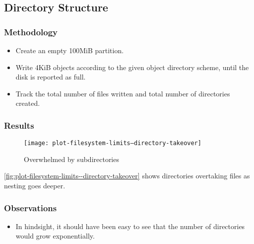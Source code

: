 \subsection{Directory Structure}

\subsubsection{Methodology}

\begin{itemize}

  \item Create an empty 100MiB partition.

  \item Write 4KiB objects according to the given object directory scheme, until
    the disk is reported as full.

  \item Track the total number of files written and total number of directories
    created.

\end{itemize}

\subsubsection{Results}

\begin{figure}[p]
  \caption{Overwhelmed by subdirectories}
  \label{fig:plot-filesystem-limits--directory-takeover}
  \centering
    \texttt{[image: plot-filesystem-limits--directory-takeover]}
\end{figure}

\autoref{fig:plot-filesystem-limits--directory-takeover} shows directories
overtaking files as nesting goes deeper.

\subsubsection{Observations}

\begin{itemize}

  \item In hindsight, it should have been easy to see that the number of
    directories would grow exponentially.

\end{itemize}
